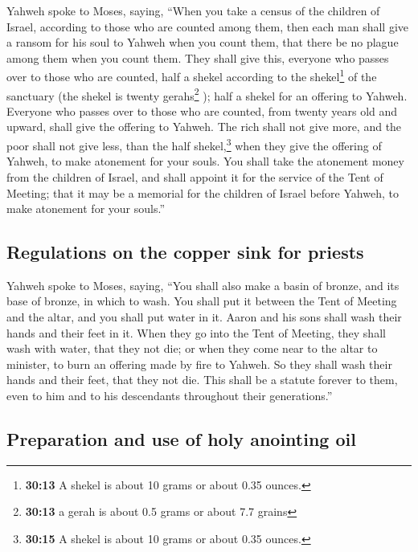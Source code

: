  Yahweh spoke to Moses, saying,  ``When
you take a census of the children of Israel, according to those who are
counted among them, then each man shall give a ransom for his soul to
Yahweh when you count them, that there be no plague among them when you
count them.  They shall give this, everyone who passes
over to those who are counted, half a shekel according to the
shekel\footnote{\textbf{30:13} A shekel is about 10 grams or about 0.35
  ounces.} of the sanctuary (the shekel is twenty gerahs\footnote{\textbf{30:13}
  a gerah is about 0.5 grams or about 7.7 grains} ); half a shekel for
an offering to Yahweh.  Everyone who passes over to those
who are counted, from twenty years old and upward, shall give the
offering to Yahweh.  The rich shall not give more, and
the poor shall not give less, than the half shekel,\footnote{\textbf{30:15}
  A shekel is about 10 grams or about 0.35 ounces.} when they give the
offering of Yahweh, to make atonement for your souls. 
You shall take the atonement money from the children of Israel, and
shall appoint it for the service of the Tent of Meeting; that it may be
a memorial for the children of Israel before Yahweh, to make atonement
for your souls.''

\hypertarget{regulations-on-the-copper-sink-for-priests}{%
\subsection{Regulations on the copper sink for
priests}\label{regulations-on-the-copper-sink-for-priests}}

 Yahweh spoke to Moses, saying,  ``You
shall also make a basin of bronze, and its base of bronze, in which to
wash. You shall put it between the Tent of Meeting and the altar, and
you shall put water in it.  Aaron and his sons shall wash
their hands and their feet in it.  When they go into the
Tent of Meeting, they shall wash with water, that they not die; or when
they come near to the altar to minister, to burn an offering made by
fire to Yahweh.  So they shall wash their hands and their
feet, that they not die. This shall be a statute forever to them, even
to him and to his descendants throughout their generations.''

\hypertarget{preparation-and-use-of-holy-anointing-oil}{%
\subsection{Preparation and use of holy anointing
oil}\label{preparation-and-use-of-holy-anointing-oil}}

